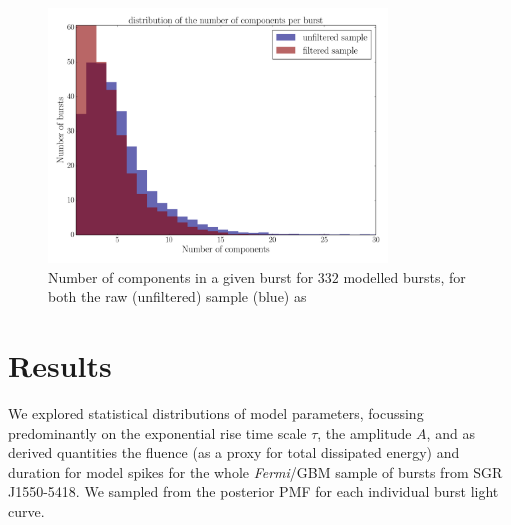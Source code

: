 \documentclass[12pt]{emulateapj}
\newcommand{\project}[1]{\textsl{#1}}
\begin{document}

\begin{figure}[htbp]
\begin{center}
\includegraphics[width=9cm]{sgr1550_nspikes.pdf}
\caption{Number of components in a given burst for $332$ modelled bursts, for both the raw (unfiltered) sample (blue) as
}
\label{fig:spikes}
\end{center}
\end{figure}

\section{Results}

We explored statistical distributions of model parameters, focussing predominantly on the exponential rise time scale $\tau$, 
the amplitude $A$, and as derived quantities the fluence (as a proxy for total dissipated energy) and duration for model spikes for
 the whole {\it Fermi}/GBM sample of bursts from SGR J1550-5418. We sampled from the posterior PMF for each individual burst light curve. 
 
\end{document}
